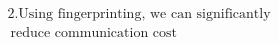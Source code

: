 \documentclass[preview]{standalone}
\begin{document}
\begin{align*}
2. \text{Using fingerprinting, we can significantly} \\ \
                         \text{reduce communication cost}
\end{align*}
\end{document}
